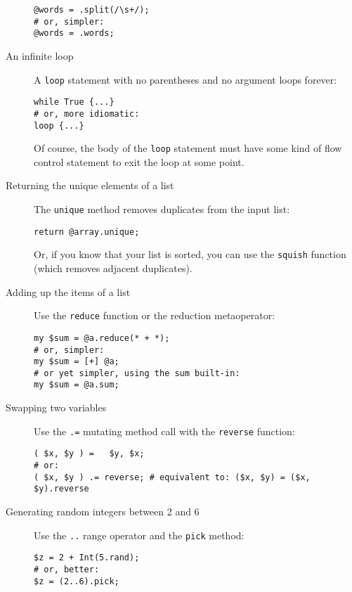 \begin{description}
\begin{verbatim}
@words = .split(/\s+/);
# or, simpler:
@words = .words;
\end{verbatim}

\item[An infinite loop] A {\tt loop} statement with no parentheses 
and no argument loops forever: 

\begin{verbatim}
while True {...}
# or, more idiomatic:
loop {...}   
\end{verbatim}

Of course, the body of the {\tt loop} statement must have some 
kind of flow control statement to exit the loop at some point.

\item[Returning the unique elements of a list] The {\tt unique} 
method removes duplicates from the input list:

\begin{verbatim}
return @array.unique;
\end{verbatim}

Or, if you know that your list is sorted, you can use the 
{\tt squish} function (which removes adjacent duplicates).

\item[Adding up the items of a list] Use the {\tt reduce} 
function or the reduction metaoperator:

\begin{verbatim}
my $sum = @a.reduce(* + *);
# or, simpler:
my $sum = [+] @a;
# or yet simpler, using the sum built-in:
my $sum = @a.sum;  
\end{verbatim}

\item[Swapping two variables] Use the \verb'.=' mutating 
method call with the \verb'reverse' function:
\begin{verbatim}
( $x, $y ) =   $y, $x;
# or:
( $x, $y ) .= reverse; # equivalent to: ($x, $y) = ($x, $y).reverse
\end{verbatim}

\item[Generating random integers between 2 and 6] Use the \verb'..' 
range operator and the {\tt pick} method:
\begin{verbatim}
$z = 2 + Int(5.rand);
# or, better:
$z = (2..6).pick;
\end{verbatim}


\end{description}
